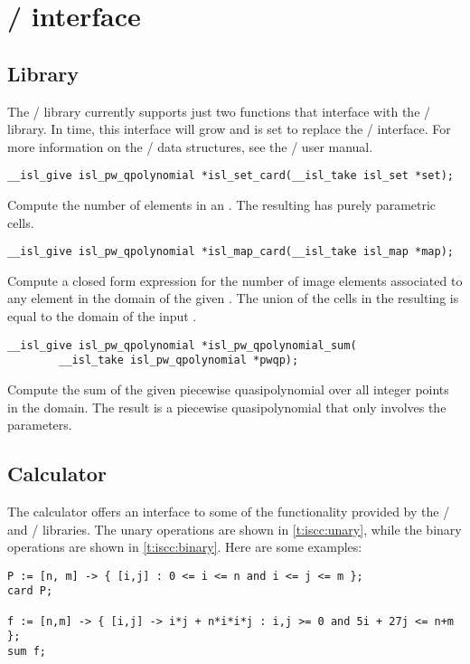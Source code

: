 \section{\protect\isl/ interface}

\subsection{Library}

The \barvinok/ library currently supports just two
functions that interface with the \isl/ library.
In time, this interface will grow and is set to replace
the \PolyLib/ interface.
For more information on the \isl/ data structures, see
the \isl/ user manual.

\begin{verbatim}
__isl_give isl_pw_qpolynomial *isl_set_card(__isl_take isl_set *set);
\end{verbatim}
Compute the number of elements in an .
The resulting  has purely parametric cells.

\begin{verbatim}
__isl_give isl_pw_qpolynomial *isl_map_card(__isl_take isl_map *map);
\end{verbatim}
Compute a closed form expression for the number of image elements
associated to any element in the domain of the given .
The union of the cells in the resulting 
is equal to the domain of the input .

\begin{verbatim}
__isl_give isl_pw_qpolynomial *isl_pw_qpolynomial_sum(
        __isl_take isl_pw_qpolynomial *pwqp);
\end{verbatim}
Compute the sum of the given piecewise quasipolynomial over
all integer points in the domain.  The result is a piecewise
quasipolynomial that only involves the parameters.

\subsection{Calculator}

The  calculator offers an interface to some
of the functionality provided by the \isl/ and \barvinok/
libraries.
The unary operations are shown in \autoref{t:iscc:unary},
while the binary operations are shown in \autoref{t:iscc:binary}.
Here are some examples:
\begin{verbatim}
P := [n, m] -> { [i,j] : 0 <= i <= n and i <= j <= m };
card P;

f := [n,m] -> { [i,j] -> i*j + n*i*i*j : i,j >= 0 and 5i + 27j <= n+m };
sum f;
\end{verbatim}

